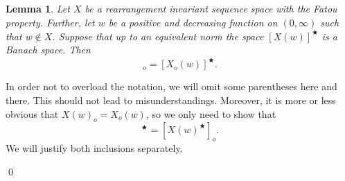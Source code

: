 \documentclass[11pt]{amsart}
\theoremstyle{definition}
\theoremstyle{definition}
\newtheorem{lemma}[theorem]{Lemma}
\theoremstyle{definition}
\theoremstyle{definition}
\theoremstyle{definition}
\theoremstyle{definition}
\theoremstyle{definition}
\theoremstyle{definition}
\numberwithin{equation}{section}
\numberwithin{equation}{section}
\numberwithin{equation}{section}
\theoremstyle{definition}
\theoremstyle{definition}
\theoremstyle{definition}
\theoremstyle{definition}
\theoremstyle{definition}
\theoremstyle{definition}
\renewenvironment{proof}{\noindent {\bf Proof.}}{\qed}
\begin{document}
		\begin{lemma} \label{LEMMA: a'la Kolwicz OC}
			{\it Let $X$ be a rearrangement invariant sequence space with the Fatou property.
			Further, let $w$ be a positive and decreasing function on $(0,\infty)$ such that $w \notin X$.
			Suppose that up to an equivalent norm the space $[X(w)]^{\bigstar}$ is a Banach space. Then}
			\begin{equation*}
				[ X(w)^{\bigstar} ]_o = \left[ X_o(w) \right]^{\bigstar}.
			\end{equation*}
		\end{lemma}
		\begin{proof}
			In order not to overload the notation, we will omit some parentheses here and there. This should not lead to misunderstandings.
			Moreover, it is more or less obvious that $X(w)_o = X_o(w)$, so we only need to show that
			\begin{equation}
				[ X(w)_o ]^{\bigstar} = [ X(w)^{\bigstar} ]_o.
			\end{equation}
			We will justify both inclusions separately.
			

\end{proof}
\end{document}
